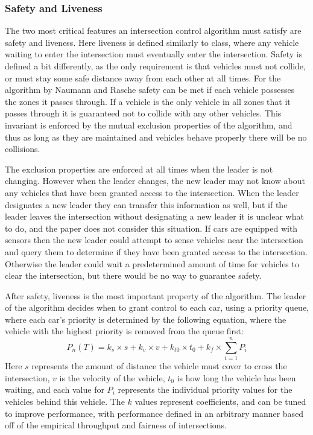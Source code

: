 \documentclass[12pt]{article}
\begin{document}
\subsubsection{Safety and Liveness}
The two most critical features an intersection control algorithm must satisfy are safety and liveness. Here liveness is defined similarly to class, where any vehicle waiting to enter the intersection must eventually enter the intersection. Safety is defined a bit differently, as the only requirement is that vehicles must not collide, or must stay some safe distance away from each other at all times. For the algorithm by Naumann and Rasche safety can be met if each vehicle possesses the zones it passes through. If a vehicle is the only vehicle in all zones that it passes through it is guaranteed not to collide with any other vehicles. This invariant is enforced by the mutual exclusion properties of the algorithm, and thus as long as they are maintained and vehicles behave properly there will be no collisions.\par
The exclusion properties are enforced at all times when the leader is not changing. However when the leader changes, the new leader may not know about any vehicles that have been granted access to the intersection. When the leader designates a new leader they can transfer this information as well, but if the leader leaves the intersection without designating a new leader it is unclear what to do, and the paper does not consider this situation. If cars are equipped with sensors then the new leader could attempt to sense vehicles near the intersection and query them to determine if they have been granted access to the intersection. Otherwise the leader could wait a predetermined amount of time for vehicles to clear the intersection, but there would be no way to guarantee safety.\par
After safety, liveness is the most important property of the algorithm. The leader of the algorithm decides when to grant control to each car, using a priority queue, where each car's priority is determined by the following equation, where the vehicle with the highest priority is removed from the queue first:
\begin{equation}
P_n(T) = k_s \times s + k_v \times v + k_{t0} \times t_0 + k_f \times \sum_{i=1}^{n} P_i 
\end{equation}
Here $s$ represents the amount of distance the vehicle must cover to cross the intersection, $v$ is the velocity of the vehicle, $t_0$ is how long the vehicle has been waiting, and each value for $P_i$ represents the individual priority values for the vehicles behind this vehicle. The $k$ values represent coefficients, and can be tuned to improve performance, with performance defined in an arbitrary manner based off of the empirical throughput and fairness of intersections.\par
\end{document}

